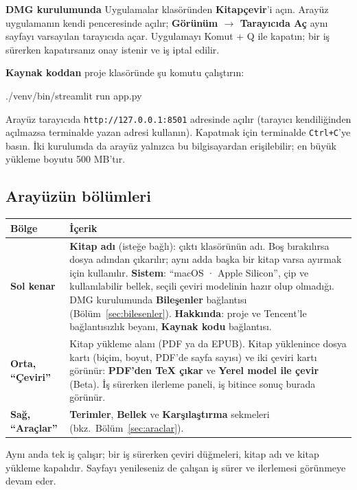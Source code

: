 \documentclass[11pt,a4paper]{article}
\newcommand{\dugme}[1]{\textsf{\bfseries #1}}
\newcommand{\dosya}[1]{\texttt{#1}}
\newcommand{\ok}{\(\rightarrow\)}
\begin{document}
\textbf{DMG kurulumunda} Uygulamalar klasöründen \textbf{Kitapçevir}'i açın.
Arayüz uygulamanın kendi penceresinde açılır; \textbf{Görünüm \ok{} Tarayıcıda
Aç} aynı sayfayı varsayılan tarayıcıda açar. Uygulamayı Komut + Q ile kapatın;
bir iş sürerken kapatırsanız onay istenir ve iş iptal edilir.

\textbf{Kaynak koddan} proje klasöründe şu komutu çalıştırın:

\begin{komut}
./venv/bin/streamlit run app.py
\end{komut}

Arayüz tarayıcıda \dosya{http://127.0.0.1:8501} adresinde açılır (tarayıcı
kendiliğinden açılmazsa terminalde yazan adresi kullanın). Kapatmak için
terminalde \texttt{Ctrl+C}'ye basın. İki kurulumda da arayüz yalnızca bu
bilgisayardan erişilebilir; en büyük yükleme boyutu 500 MB'tır.

\subsection{Arayüzün bölümleri}

\renewcommand{\arraystretch}{1.35}
\noindent\begin{tabular}{@{}L{3.2cm}L{12.2cm}@{}}
\toprule
\textbf{Bölge} & \textbf{İçerik} \\
\midrule
\textbf{Sol kenar} & \dugme{Kitap adı} (isteğe bağlı): çıktı klasörünün adı.
Boş bırakılırsa dosya adından çıkarılır; aynı adda başka bir kitap varsa
ayırmak için kullanılır. \dugme{Sistem}: ``macOS · Apple Silicon'', çip ve
kullanılabilir bellek, seçili çeviri modelinin hazır olup olmadığı. DMG
kurulumunda \dugme{Bileşenler} bağlantısı (Bölüm~\ref{sec:bilesenler}).
\dugme{Hakkında}: proje ve Tencent'le bağlantısızlık beyanı,
\dugme{Kaynak kodu} bağlantısı. \\
\textbf{Orta, ``Çeviri''} & Kitap yükleme alanı (PDF ya da EPUB). Kitap
yüklenince dosya kartı (biçim, boyut, PDF'de sayfa sayısı) ve iki çeviri
kartı görünür: \dugme{PDF'den TeX çıkar} ve \dugme{Yerel model ile çevir}
(Beta). İş sürerken ilerleme paneli, iş bitince sonuç burada görünür. \\
\textbf{Sağ, ``Araçlar''} & \dugme{Terimler}, \dugme{Bellek} ve
\dugme{Karşılaştırma} sekmeleri (bkz.\ Bölüm~\ref{sec:araclar}). \\
\bottomrule
\end{tabular}
\vspace{6pt}

Aynı anda tek iş çalışır; bir iş sürerken çeviri düğmeleri, kitap adı ve
kitap yükleme kapalıdır. Sayfayı yenileseniz de çalışan iş sürer ve ilerlemesi
görünmeye devam eder.
\end{document}
